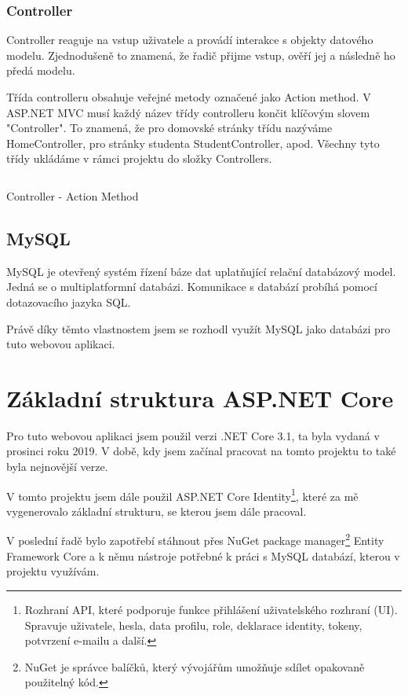 \documentclass[a4paper, 12pt]{report}
\begin{document}
			\subsection{Controller} \label{Controller_teorie}
			Controller reaguje na vstup uživatele a provádí interakce s objekty datového modelu. Zjednodušeně to znamená, že řadič přijme vstup, ověří jej a následně ho předá modelu.\cite{MVC_Wiki_EN}\par
			Třída controlleru obsahuje veřejné metody označené jako Action method. V ASP.NET MVC musí každý název třídy controlleru končit klíčovým slovem "Controller". To znamená, že pro domovské stránky třídu nazýváme HomeController, pro stránky studenta StudentController, apod. Všechny tyto třídy ukládáme v rámci projektu do složky Controllers.
	\begin{listing}[H]
	\inputminted{csharp}{SourceCode/Controllers/ActionMethod.cs}
	\caption{Controller - Action Method}
	\label{ActionMethod}
	\end{listing}
	\section{MySQL}
	MySQL je otevřený systém řízení báze dat uplatňující relační databázový model. Jedná se o multiplatformní databázi. Komunikace s databází probíhá pomocí dotazovacího jazyka SQL.\cite{MySQL_Wiki_CZ}\par
	Právě díky těmto vlastnostem jsem se rozhodl využít MySQL jako databázi pro tuto webovou aplikaci.

	\chapter{Základní struktura ASP.NET Core}
	Pro tuto webovou aplikaci jsem použil verzi .NET Core 3.1, ta byla vydaná v prosinci roku 2019. V době, kdy jsem začínal pracovat na tomto projektu to také byla nejnovější verze.\par
	V tomto projektu jsem dále použil ASP.NET Core Identity\footnote{Rozhraní API, které podporuje funkce přihlášení uživatelského rozhraní (UI). Spravuje uživatele, hesla, data profilu, role, deklarace identity, tokeny, potvrzení e-mailu a další.\cite{ASP.NET_Core_Identity}}, které za mě vygenerovalo základní strukturu, se kterou jsem dále pracoval.\par
	V poslední řadě bylo zapotřebí stáhnout přes NuGet package manager\footnote{NuGet je správce balíčků, který vývojářům umožňuje sdílet opakovaně použitelný kód.} Entity Framework Core a k němu nástroje potřebné k práci s MySQL databází, kterou v projektu využívám.
\end{document}
